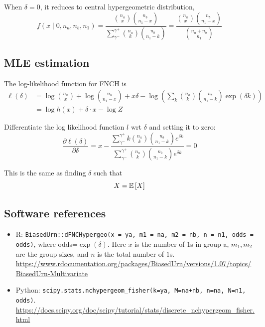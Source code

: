 When $\delta=0$, it reduces to central hypergeometric distribution,
\begin{equation}
	f(x\mid 0,n_a,n_b,n_1) = 
	\frac{
		\binom{n_a}{x} \binom{n_b}{n_1-x}
	}{
		\sum_{\gamma^{-}}^{\gamma^{+}} \binom{n_a}{k} \binom{n_b}{n_1 - k}
	}
	= \frac{
		\binom{n_a}{x} \binom{n_b}{n_1-x}
	}{
		\binom{n_a+n_b}{n_1}
	}
\end{equation}

\subsection{MLE estimation}

The log-likelihood function for FNCH is
\begin{align}
	\ell(\delta)
	&=\log\binom{n_a}{x}+\log\binom{n_b}{n_1-x}+x\delta-\log\left(\sum_{k}\binom{n_a}{k}\binom{n_b}{n_1-k}\exp(\delta k)\right) \\
	&= \log h(x) + \delta \cdot x - \log Z
\end{align}

Differentiate the log likelihood function $l$ wrt $\delta$
and setting it to zero:
\begin{equation}
	\frac{\partial\ell(\delta)}{\partial\delta}
	=x-\frac{\sum_{\gamma^{-}}^{\gamma^{+}} k\binom{n_a}{k}\binom{n_b}{n_1-k} e^{\delta k}}{\sum_{\gamma^{-}}^{\gamma^{+}} \binom{n_a}{k}\binom{n_b}{n_1-k}e^{\delta k}}=0
\end{equation}

This is the same as finding $\delta$ such that
\begin{equation}
	X = \ERW{X}
\end{equation}

\subsection{Software references}

\begin{itemize}
	\item R:
	\verb|BiasedUrn::dFNCHypergeo(x = ya, m1 = na, m2 = nb, n = n1, odds = odds)|,
	where odds=$\exp(\delta)$.
	Here $x$ is the number of $1$s in group a,
	$m_1,m_2$ are the group sizes,
	and $n$ is the total number of $1$s.
	\url{https://www.rdocumentation.org/packages/BiasedUrn/versions/1.07/topics/BiasedUrn-Multivariate}
	\item Python:
	\verb|scipy.stats.nchypergeom_fisher(k=ya, M=na+nb, n=na, N=n1, odds)|.
	\url{https://docs.scipy.org/doc/scipy/tutorial/stats/discrete_nchypergeom_fisher.html}
\end{itemize}


